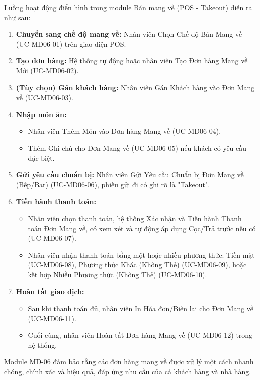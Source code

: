 \label{sssec:md06_overall_workflow}
Luồng hoạt động điển hình trong module Bán mang về (POS - Takeout) diễn ra như sau:
\begin{enumerate}
    \item \textbf{Chuyển sang chế độ mang về:} Nhân viên Chọn Chế độ Bán Mang về (UC-MD06-01) trên giao diện POS.
    \item \textbf{Tạo đơn hàng:} Hệ thống tự động hoặc nhân viên Tạo Đơn hàng Mang về Mới (UC-MD06-02).
    \item \textbf{(Tùy chọn) Gán khách hàng:} Nhân viên Gán Khách hàng vào Đơn Mang về (UC-MD06-03).
    \item \textbf{Nhập món ăn:}
        \begin{itemize}
            \item Nhân viên Thêm Món vào Đơn hàng Mang về (UC-MD06-04).
            \item Thêm Ghi chú cho Đơn Mang về (UC-MD06-05) nếu khách có yêu cầu đặc biệt.
        \end{itemize}
    \item \textbf{Gửi yêu cầu chuẩn bị:} Nhân viên Gửi Yêu cầu Chuẩn bị Đơn Mang về (Bếp/Bar) (UC-MD06-06), phiếu gửi đi có ghi rõ là "Takeout".
    \item \textbf{Tiến hành thanh toán:}
        \begin{itemize}
            \item Nhân viên chọn thanh toán, hệ thống Xác nhận và Tiến hành Thanh toán Đơn Mang về, có xem xét và tự động áp dụng Cọc/Trả trước nếu có (UC-MD06-07).
            \item Nhân viên nhận thanh toán bằng một hoặc nhiều phương thức: Tiền mặt (UC-MD06-08), Phương thức Khác (Không Thẻ) (UC-MD06-09), hoặc kết hợp Nhiều Phương thức (Không Thẻ) (UC-MD06-10).
        \end{itemize}
    \item \textbf{Hoàn tất giao dịch:}
        \begin{itemize}
            \item Sau khi thanh toán đủ, nhân viên In Hóa đơn/Biên lai cho Đơn Mang về (UC-MD06-11).
            \item Cuối cùng, nhân viên Hoàn tất Đơn hàng Mang về (UC-MD06-12) trong hệ thống.
        \end{itemize}
\end{enumerate}
Module MD-06 đảm bảo rằng các đơn hàng mang về được xử lý một cách nhanh chóng, chính xác và hiệu quả, đáp ứng nhu cầu của cả khách hàng và nhà hàng.


